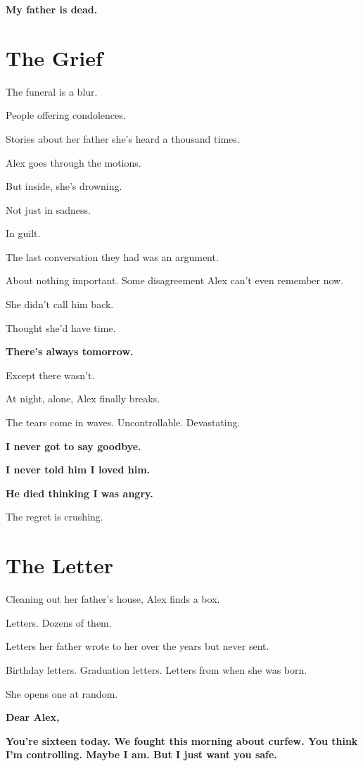 \documentclass[11pt,twoside]{book}
\begin{document}
\textbf{My father is dead.}

\section*{The Grief}

The funeral is a blur.

People offering condolences.

Stories about her father she's heard a thousand times.

Alex goes through the motions.

But inside, she's drowning.

Not just in sadness.

In guilt.

The last conversation they had was an argument.

About nothing important. Some disagreement Alex can't even remember now.

She didn't call him back.

Thought she'd have time.

\textbf{There's always tomorrow.}

Except there wasn't.

At night, alone, Alex finally breaks.

The tears come in waves. Uncontrollable. Devastating.

\textbf{I never got to say goodbye.}

\textbf{I never told him I loved him.}

\textbf{He died thinking I was angry.}

The regret is crushing.

\section*{The Letter}

Cleaning out her father's house, Alex finds a box.

Letters. Dozens of them.

Letters her father wrote to her over the years but never sent.

Birthday letters. Graduation letters. Letters from when she was born.

She opens one at random.

\textbf{Dear Alex,}

\textbf{You're sixteen today. We fought this morning about curfew. You think I'm controlling. Maybe I am. But I just want you safe.}
\end{document}
